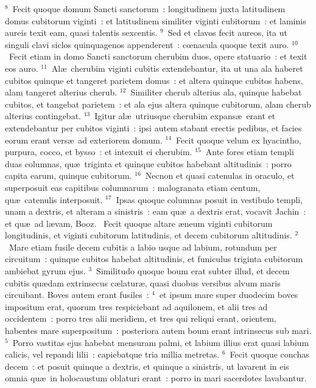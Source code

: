 ${}^{8}$~Fecit quoque domum Sancti sanctorum~: longitudinem juxta latitudinem domus cubitorum viginti~: et latitudinem similiter viginti cubitorum~: et laminis aureis texit eam, quasi talentis sexcentis.
${}^{9}$~Sed et clavos fecit aureos, ita ut singuli clavi siclos quinquagenos appenderent~: cœnacula quoque texit auro.
${}^{10}$~Fecit etiam in domo Sancti sanctorum cherubim duos, opere statuario~: et texit eos auro.
${}^{11}$~Al\ae\ cherubim viginti cubitis extendebantur, ita ut una ala haberet cubitos quinque et tangeret parietem domus~: et altera quinque cubitos habens, alam tangeret alterius cherub.
${}^{12}$~Similiter cherub alterius ala, quinque habebat cubitos, et tangebat parietem~: et ala ejus altera quinque cubitorum, alam cherub alterius contingebat.
${}^{13}$~Igitur al\ae\ utriusque cherubim expans\ae\ erant et extendebantur per cubitos viginti~: ipsi autem stabant erectis pedibus, et facies eorum erant vers\ae\ ad exteriorem domum.
${}^{14}$~Fecit quoque velum ex hyacintho, purpura, cocco, et bysso~: et intexuit ei cherubim.
${}^{15}$~Ante fores etiam templi duas columnas, qu\ae\ triginta et quinque cubitos habebant altitudinis~: porro capita earum, quinque cubitorum.
${}^{16}$~Necnon et quasi catenulas in oraculo, et superposuit eas capitibus columnarum~: malogranata etiam centum, qu\ae\ catenulis interposuit.
${}^{17}$~Ipsas quoque columnas posuit in vestibulo templi, unam a dextris, et alteram a sinistris~: eam qu\ae\ a dextris erat, vocavit Jachin~: et qu\ae\ ad l\ae vam, Booz.
~\lettrine[lines=10,image=true,loversize=0.05,lraise=-0.03]{F}{}ecit quoque altare \ae neum viginti cubitorum longitudinis, et viginti cubitorum latitudinis, et decem cubitorum altitudinis.
${}^{2}$~Mare etiam fusile decem cubitis a labio usque ad labium, rotundum per circuitum~: quinque cubitos habebat altitudinis, et funiculus triginta cubitorum ambiebat gyrum ejus.
${}^{3}$~Similitudo quoque boum erat subter illud, et decem cubitis qu\ae dam extrinsecus c\ae latur\ae , quasi duobus versibus alvum maris circuibant. Boves autem erant fusiles~:
${}^{4}$~et ipsum mare super duodecim boves impositum erat, quorum tres respiciebant ad aquilonem, et alii tres ad occidentem~: porro tres alii meridiem, et tres qui reliqui erant, orientem, habentes mare superpositum~: posteriora autem boum erant intrinsecus sub mari.
${}^{5}$~Porro vastitas ejus habebat mensuram palmi, et labium illius erat quasi labium calicis, vel repandi lilii~: capiebatque tria millia metretas.
${}^{6}$~Fecit quoque conchas decem~: et posuit quinque a dextris, et quinque a sinistris, ut lavarent in eis omnia qu\ae\ in holocaustum oblaturi erant~: porro in mari sacerdotes lavabantur.
